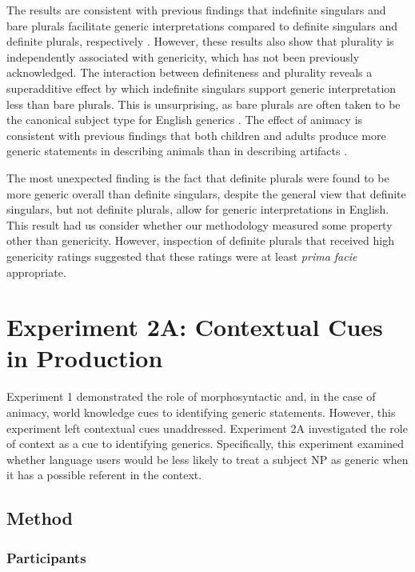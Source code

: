 \documentclass[10pt,letterpaper]{article}
\begin{document}
The results are consistent with previous findings that indefinite singulars and bare plurals facilitate generic interpretations compared to definite singulars and definite plurals, respectively \cite{Cimpian:2011, Gelman:2003}. However, these results also show that plurality is independently associated with genericity, which has not been previously acknowledged. The interaction between definiteness and plurality reveals a superadditive effect by which indefinite singulars support generic interpretation less than bare plurals. This is unsurprising, as bare plurals are often taken to be the canonical subject type for English generics \cite{Carlson:1977,Krifka:1995,Lyons:1977}. The effect of animacy is consistent with previous findings that both children and adults produce more generic statements in describing animals than in describing artifacts \cite{Brandone:2009}.

The most unexpected finding is the fact that definite plurals were found to be more generic overall than definite singulars, despite the general view that definite singulars, but not definite plurals, allow for generic interpretations in English. This result had us consider whether our methodology measured some property other than genericity. However, inspection of definite plurals that received high genericity ratings suggested that these ratings were at least \emph{prima facie} appropriate.

\section{Experiment 2A: Contextual Cues in Production}

Experiment 1 demonstrated the role of morphosyntactic and, in the case of animacy, world knowledge cues to identifying generic statements. However, this experiment left contextual cues unaddressed. Experiment 2A investigated the role of context as a cue to identifying generics. Specifically, this experiment examined whether language users would be less likely to treat a subject NP as generic when it has a possible referent in the context.

\subsection{Method}

\subsubsection{Participants} 
\end{document}
